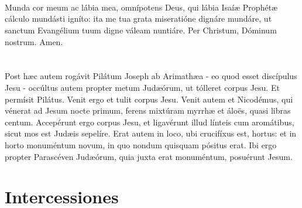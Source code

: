 \documentclass[12pt, a4paper]{article}
\begin{document}
	\\\\
	\\
	Munda cor meum ac lábia mea, omnípotens Deus, qui lábia Isaíæ Prophétæ cálculo mundásti igníto: ita me tua grata miseratióne dignáre mundáre, ut sanctum Evangélium tuum digne váleam nuntiáre. Per Christum, Dóminum nostrum. Amen.
	\\\\
	\\
	Post hæc autem rogávit Pilátum Joseph ab Arimathæa - eo quod esset discípulus Jesu - occúltus autem propter metum Judæórum, ut tólleret corpus Jesu. Et permísit Pilátus. Venit ergo et tulit corpus Jesu. Venit autem et Nicodémus, qui vénerat ad Jesum nocte primum, ferens mixtúram myrrhæ et áloës, quasi libras centum. Accepérunt ergo corpus Jesu, et ligavérunt illud línteis cum aromátibus, sicut mos est Judæis sepelíre. Erat autem in loco, ubi crucifíxus est, hortus: et in horto monuméntum novum, in quo nondum quisquam pósitus erat. Ibi ergo propter Parascéven Judæórum, quia juxta erat monuméntum, posuérunt Jesum.
	
	\section*{Intercessiones}
	
\end{document}
